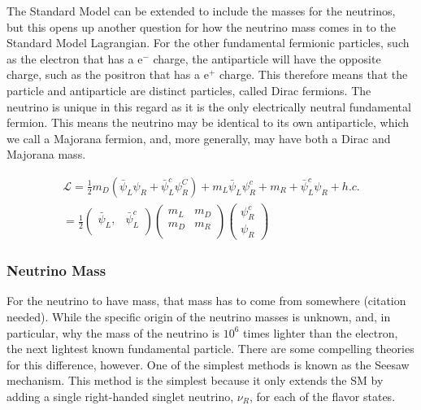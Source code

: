 \documentclass[12pt,a4paper]{article}
\begin{document}
The Standard Model can be extended to include the masses for the neutrinos, but this opens up another question for how the neutrino mass comes in to the Standard Model Lagrangian. For the other fundamental fermionic particles, such as the electron that has a $\textrm{e}^-$ charge, the antiparticle will have the opposite charge, such as the positron that has a $\textrm{e}^+$ charge. This therefore means that the particle and antiparticle are distinct particles, called Dirac fermions. The neutrino is unique in this regard as it is the only electrically neutral fundamental fermion. This means the neutrino may be identical to its own antiparticle, which we call a Majorana fermion, and, more generally, may have both a Dirac and Majorana mass.

\begin{center}
\begin{eqnarray}
\mathcal{L} = \frac{1}{2}m_D(\bar{\psi}_L\psi_R+\bar{\psi}^c_L\psi^C_R)+m_L\bar{\psi}_L\psi^c_R+m_R+\bar{\psi}^c_L\psi_R +h.c. \\
=\frac{1}{2} \begin{pmatrix}
\bar{\psi}_L,& \bar{\psi}^c_L \\
\end{pmatrix} \begin{pmatrix}
m_L & m_D \\
m_D & m_R \\
\end{pmatrix}
\begin{pmatrix}
\psi^c_R \\
\psi_R
\end{pmatrix}
\end{eqnarray}
\end{center}

\subsubsection{Neutrino Mass}

For the neutrino to have mass, that mass has to come from somewhere (\color{blue}citation needed\color{black}). While the specific origin of the neutrino masses is unknown, and, in particular, why the mass of the neutrino is $10^6$ times lighter than the electron, the next lightest known fundamental particle. There are some compelling theories for this difference, however. One of the simplest methods is known as the Seesaw mechanism. This method is the simplest because it only extends the SM by adding a single right-handed singlet neutrino, $\nu_R$, for each of the flavor states.
\end{document}
